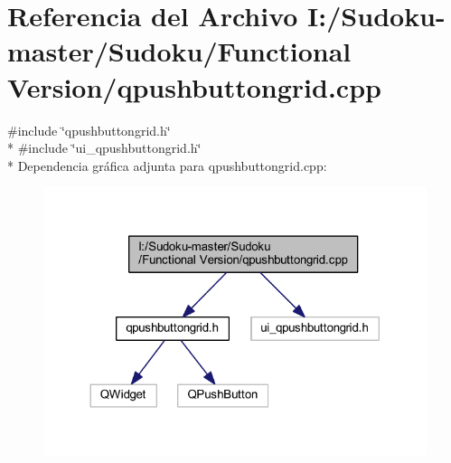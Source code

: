 \section{Referencia del Archivo I\-:/\-Sudoku-\/master/\-Sudoku/\-Functional Version/qpushbuttongrid.cpp}
\label{qpushbuttongrid_8cpp}
{\ttfamily \#include \char`\"{}qpushbuttongrid.\-h\char`\"{}}\\*
{\ttfamily \#include \char`\"{}ui\-\_\-qpushbuttongrid.\-h\char`\"{}}\\*
Dependencia gráfica adjunta para qpushbuttongrid.\-cpp\-:
\nopagebreak
\begin{figure}[H]
\begin{center}
\leavevmode
\includegraphics[width=320pt]{qpushbuttongrid_8cpp__incl}
\end{center}
\end{figure}
